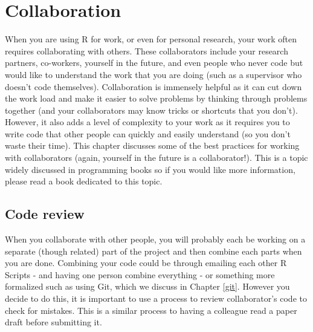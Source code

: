 \documentclass[
  12pt,
]{book}
\begin{document}
\hypertarget{collaboration}{%
\chapter{Collaboration}\label{collaboration}}

When you are using R for work, or even for personal research, your work often requires collaborating with others. These collaborators include your research partners, co-workers, yourself in the future, and even people who never code but would like to understand the work that you are doing (such as a supervisor who doesn't code themselves). Collaboration is immensely helpful as it can cut down the work load and make it easier to solve problems by thinking through problems together (and your collaborators may know tricks or shortcuts that you don't). However, it also adds a level of complexity to your work as it requires you to write code that other people can quickly and easily understand (so you don't waste their time). This chapter discusses some of the best practices for working with collaborators (again, yourself in the future is a collaborator!). This is a topic widely discussed in programming books so if you would like more information, please read a book dedicated to this topic.

\hypertarget{code-review}{%
\section{Code review}\label{code-review}}

When you collaborate with other people, you will probably each be working on a separate (though related) part of the project and then combine each parts when you are done. Combining your code could be through emailing each other R Scripts - and having one person combine everything - or something more formalized such as using Git, which we discuss in Chapter \ref{git}. However you decide to do this, it is important to use a process to review collaborator's code to check for mistakes. This is a similar process to having a colleague read a paper draft before submitting it.
\end{document}
